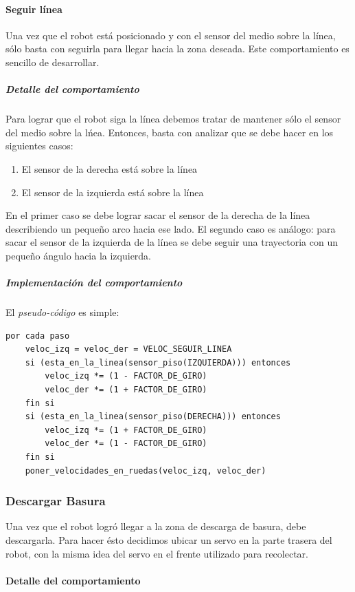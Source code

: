 \paragraph{Seguir l\'inea}
\label{follow_line}
Una vez que el robot est\'a posicionado y con el sensor del medio sobre la
l\'inea, s\'olo basta con seguirla para llegar hacia la zona deseada. Este
comportamiento es sencillo de desarrollar.

\subparagraph{Detalle del comportamiento}
Para lograr que el robot siga la l\'inea debemos tratar de mantener
s\'olo el sensor del medio sobre la l\'nea. Entonces, basta con analizar que se
debe hacer en los siguientes casos:
\begin{enumerate}
	\item El sensor de la derecha est\'a sobre la l\'inea
	\item El sensor de la izquierda est\'a sobre la l\'inea
\end{enumerate}
En el primer caso se debe lograr sacar el sensor de la derecha de la l\'inea
describiendo un peque\~no arco hacia ese lado. El segundo caso es an\'alogo:
para sacar el sensor de la izquierda de la l\'inea se debe seguir una
trayectoria con un peque\~no \'angulo hacia la izquierda. 

\subparagraph{Implementaci\'on del comportamiento}
El \emph{pseudo-c\'odigo} es simple:
\begin{verbatim}
por cada paso
    veloc_izq = veloc_der = VELOC_SEGUIR_LINEA
    si (esta_en_la_linea(sensor_piso(IZQUIERDA))) entonces
        veloc_izq *= (1 - FACTOR_DE_GIRO)
        veloc_der *= (1 + FACTOR_DE_GIRO)
    fin si
    si (esta_en_la_linea(sensor_piso(DERECHA))) entonces
        veloc_izq *= (1 + FACTOR_DE_GIRO)
        veloc_der *= (1 - FACTOR_DE_GIRO)
    fin si
    poner_velocidades_en_ruedas(veloc_izq, veloc_der)
\end{verbatim}

\subsubsection{Descargar Basura}
\label{unload_garbage}
Una vez que el robot logr\'o llegar a la zona de descarga de basura, debe
descargarla. Para hacer \'esto decidimos ubicar un servo en la parte trasera
del robot, con la misma idea del servo en el frente utilizado para
recolectar.

\paragraph{Detalle del comportamiento}

